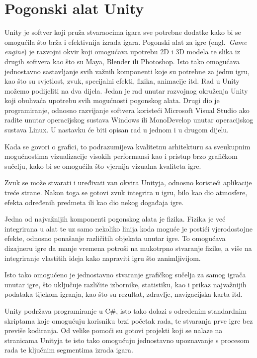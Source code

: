 \section{Pogonski alat Unity}
Unity je softver koji pruža stvaraocima igara sve potrebne dodatke kako bi se omogućila što brža i efektivnija izrada igara.
Pogonski alat za igre (engl.~\textit{Game engine}) je razvojni okvir koji omogućava upotrebu 2D i 3D modela te slika iz drugih softvera kao što su Maya, Blender ili Photoshop.
Isto tako omogućava jednostavno sastavljanje svih važnih komponenti koje su potrebne za jednu igru, kao što su svjetlost, zvuk, specijalni efekti, fizika, animacije itd.
Rad u Unity možemo podijeliti na dva dijela. Jedan je rad unutar razvojnog okruženja Unity koji obuhvaća upotrebu svih mogućnosti pogonskog alata. Drugi dio je programiranje, odnosno razvijanje softvera koristeći Microsoft Visual Studio ako radite unutar operacijskog sustava Windows ili MonoDevelop unutar operacijskog sustava Linux.
U nastavku će biti opisan rad u jednom i u drugom dijelu.

Kada se govori o grafici, to podrazumijeva kvalitetnu arhitekturu sa sveukupnim mogućnostima vizualizacije visokih performansi kao i pristup brzo grafičkom sučelju, kako bi se omogućila što vjernija vizualna kvaliteta igre.

Zvuk se može stvarati i uređivati van okvira Unityja, odnosno koristeći aplikacije treće strane. Nakon toga se gotovi zvuk integrira u igru, bilo kao dio atmosfere, efekta određenih predmeta ili kao dio nekog događaja igre.

Jedna od najvažnijih komponenti pogonskog alata je fizika. Fizika je već integrirana u alat te uz samo nekoliko linija koda moguće je postići vjerodostojne efekte, odnosno ponašanje različitih objekata unutar igre. To omogućava dizajneru igre da manje vremena potroši na mukotrpno stvaranje fizike, a više na integriranje vlastitih ideja kako napraviti igru što zanimljivijom.

Isto tako omogućeno je jednostavno stvaranje grafičkog sučelja za samog igrača unutar igre, što uključuje različite izbornike, statistiku, kao i prikaz najvažnijih podataka tijekom igranja, kao što su rezultat, zdravlje, navigacijska karta itd.

Unity podržava programiranje u C\#, isto tako dolazi s određenim standardnim skriptama koje omogućuju korisniku brzi početak rada, te stvaranja prve igre bez previše kodiranja. Od velike pomoći su gotovi projekti koji se nalaze na stranicama Unityja te isto tako omogućuju jednostavno upoznavanje s procesom rada te ključnim segmentima izrada igara.

